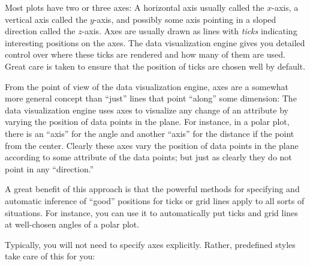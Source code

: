 Most plots have two or three axes: A horizontal axis usually called
the $x$-axis, a vertical axis called the $y$-axis, and possibly some 
axis pointing in a sloped direction called the $z$-axis. Axes are
usually drawn as lines with \emph{ticks} indicating interesting
positions on the axes. The data visualization engine gives you
detailed control over where these ticks are rendered and how many of
them are used. Great care is taken to ensure that the position of
ticks are chosen well by default.

From the point of view of the data visualization engine, axes are a
somewhat more general concept than ``just'' lines that point ``along''
some dimension: The data visualization engine uses axes to visualize
any change of an attribute by varying the position of data points in the
plane. For instance, in a polar plot, there is an ``axis'' for the
angle and another ``axis'' for the distance if the point from the
center. Clearly these axes vary the position of data points in the
plane according to some attribute of the data points; but just as
clearly they do not point in any ``direction.''

A great benefit of this approach is that the powerful methods for
specifying and automatic inference of ``good'' positions for ticks or
grid lines apply to all sorts of situations. For instance, you can use
it to automatically put ticks and grid lines at well-chosen angles of
a polar plot.

Typically, you will not need to specify axes explicitly. Rather,
predefined styles take care of this for you:


    \begin{codeexample}[]
    \end{codeexample}
    

    \begin{codeexample}[]
    \end{codeexample}
    

